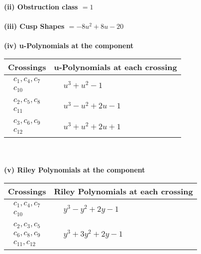 \documentclass[1p]{elsarticle_modified}
\theoremstyle{definition}
\begin{document}
\flushleft \textbf{(ii) Obstruction class $= 1$}\\~\\
\flushleft \textbf{(iii) Cusp Shapes $= -8 u^2+8 u-20$}\\~\\
\newpage\renewcommand{\arraystretch}{1}
\flushleft \textbf{(iv) u-Polynomials at the component}\newline \\
\begin{tabular}{m{50pt}|m{274pt}}
Crossings & \hspace{64pt}u-Polynomials at each crossing \\
\hline $$\begin{aligned}c_{1},c_{4},c_{7}\\c_{10}\end{aligned}$$&$\begin{aligned}
&u^3+u^2-1
\end{aligned}$\\
\hline $$\begin{aligned}c_{2},c_{5},c_{8}\\c_{11}\end{aligned}$$&$\begin{aligned}
&u^3- u^2+2 u-1
\end{aligned}$\\
\hline $$\begin{aligned}c_{3},c_{6},c_{9}\\c_{12}\end{aligned}$$&$\begin{aligned}
&u^3+u^2+2 u+1
\end{aligned}$\\
\hline
\end{tabular}\\~\\
\newpage\renewcommand{\arraystretch}{1}
\flushleft \textbf{(v) Riley Polynomials at the component}\newline \\
\begin{tabular}{m{50pt}|m{274pt}}
Crossings & \hspace{64pt}Riley Polynomials at each crossing \\
\hline $$\begin{aligned}c_{1},c_{4},c_{7}\\c_{10}\end{aligned}$$&$\begin{aligned}
&y^3- y^2+2 y-1
\end{aligned}$\\
\hline $$\begin{aligned}c_{2},c_{3},c_{5}\\c_{6},c_{8},c_{9}\\c_{11},c_{12}\end{aligned}$$&$\begin{aligned}
&y^3+3 y^2+2 y-1
\end{aligned}$\\
\hline
\end{tabular}\\~\\
\end{document}
